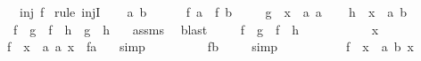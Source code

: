 \begin{isabellebody}
\ \ \ {\isachardoublequoteopen}\ inj\ f{\isachardoublequoteclose}\isanewline
%
\isadelimproof
%
\endisadelimproof
%
\isatagproof
{}\isamarkupfalse%
\ {\isacharparenleft}rule\ injI{\isacharparenright}\isanewline
\ \ \isamarkupfalse%
\ a\ b\ \isanewline
\ \ \isamarkupfalse%
\ {}{\isacharcolon}\ {\isachardoublequoteopen}f\ a\ {\isacharequal}\ f\ b\ {\isachardoublequoteclose}\isanewline
\ \ \isamarkupfalse%
\ {\isacharquery}g\ {\isacharequal}\ {\isachardoublequoteopen}{\isasymlambda}x\ {\isacharcolon}{\isacharcolon}\ {\isacharprime}a{\isachardot}\ a{\isachardoublequoteclose}\isanewline
\ \ \isamarkupfalse%
\ {\isacharquery}h\ {\isacharequal}\ {\isachardoublequoteopen}{\isasymlambda}x\ {\isacharcolon}{\isacharcolon}\ {\isacharprime}a{\isachardot}\ b{\isachardoublequoteclose}\isanewline
\ \ \isamarkupfalse%
\ {}{\isacharcolon}\ {\isachardoublequoteopen}\ {\isacharparenleft}f\ {\isasymcirc}\ {\isacharquery}g\ {\isacharequal}\ f\ {\isasymcirc}\ {\isacharquery}h\ {\isasymlongrightarrow}\ {\isacharquery}g\ {\isacharequal}\ {\isacharquery}h{\isacharparenright}{\isachardoublequoteclose}\ \ \isamarkupfalse%
\ assms\ \isamarkupfalse%
\ blast\isanewline
\ \ \isamarkupfalse%
\ {}{\isacharcolon}\ {\isachardoublequoteopen}f\ {\isasymcirc}\ {\isacharquery}g\ {\isacharequal}\ f\ {\isasymcirc}\ {\isacharquery}h{\isachardoublequoteclose}\ \isanewline
\ \ \isamarkupfalse%
\ \isanewline
\ \ \ \ \isamarkupfalse%
\ x\isanewline
\ \ \ \ \isamarkupfalse%
\ {\isachardoublequoteopen}\ {\isacharparenleft}f\ {\isasymcirc}\ {\isacharparenleft}{\isasymlambda}x\ {\isacharcolon}{\isacharcolon}\ {\isacharprime}a{\isachardot}\ a{\isacharparenright}{\isacharparenright}\ x\ {\isacharequal}\ f{\isacharparenleft}a{\isacharparenright}\ {\isachardoublequoteclose}\ \isamarkupfalse%
\ simp\isanewline
\ \ \ \ \isamarkupfalse%
\ \isamarkupfalse%
\ {\isachardoublequoteopen}{\isachardot}{\isachardot}{\isachardot}\ {\isacharequal}\ f{\isacharparenleft}b{\isacharparenright}{\isachardoublequoteclose}\ \isamarkupfalse%
\ {}\ \isamarkupfalse%
\ simp\isanewline
\ \ \ \ \isamarkupfalse%
\ \isamarkupfalse%
\ {\isachardoublequoteopen}{\isachardot}{\isachardot}{\isachardot}\ {\isacharequal}\ \ {\isacharparenleft}f\ {\isasymcirc}\ {\isacharparenleft}{\isasymlambda}x\ {\isacharcolon}{\isacharcolon}\ {\isacharprime}a{\isachardot}\ b{\isacharparenright}{\isacharparenright}\ x{\isachardoublequoteclose}\ \isamarkupfalse%

\end{isabellebody}
